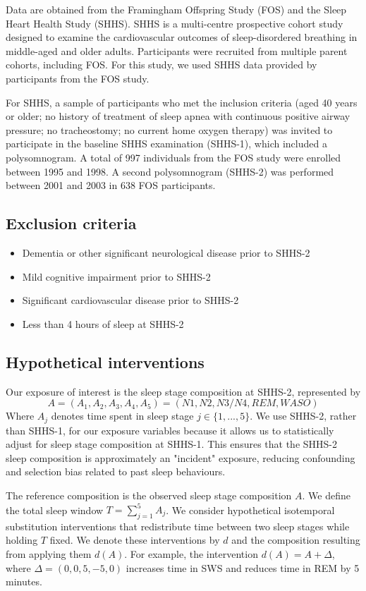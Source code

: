 \documentclass{article}
\begin{document}
Data are obtained from the Framingham Offspring Study (FOS) and the Sleep Heart Health Study (SHHS). SHHS is a multi-centre prospective cohort study designed to examine the cardiovascular outcomes of sleep-disordered breathing in middle-aged and older adults. Participants were recruited from multiple parent cohorts, including FOS. For this study, we used SHHS data provided by participants from the FOS study.

For SHHS, a sample of participants who met the inclusion criteria (aged 40 years or older; no history of treatment of sleep apnea with continuous positive airway pressure; no tracheostomy; no current home oxygen therapy) was invited to participate in the baseline SHHS examination (SHHS-1), which included a polysomnogram. A total of 997 individuals from the FOS study were enrolled between 1995 and 1998. A second polysomnogram (SHHS-2) was performed between 2001 and 2003 in 638 FOS participants.

\subsection{Exclusion criteria}

\begin{itemize}
    \item Dementia or other significant neurological disease prior to SHHS-2
    \item Mild cognitive impairment prior to SHHS-2
    \item Significant cardiovascular disease prior to SHHS-2
    \item Less than 4 hours of sleep at SHHS-2
\end{itemize}

\subsection{Hypothetical interventions}

Our exposure of interest is the sleep stage composition at SHHS-2, represented by $$A = (A_1, A_2, A_3, A_4, A_5) = (N1, N2, N3/N4, REM, WASO)$$ Where $A_j$ denotes time spent in sleep stage $j \in \{1,...,5\}$. We use SHHS-2, rather than SHHS-1, for our exposure variables because it allows us to statistically adjust for sleep stage composition at SHHS-1. This ensures that the SHHS-2 sleep composition is approximately an "incident" exposure, reducing confounding and selection bias related to past sleep behaviours.

The reference composition is the observed sleep stage composition $A$. We define the total sleep window $T = \sum_{j=1}^{5} A_j$. We consider hypothetical isotemporal substitution interventions that redistribute time between two sleep stages while holding $T$ fixed. We denote these interventions by $d$ and the composition resulting from applying them $d(A)$. For example, the intervention $d(A) = A + \Delta$, where $\Delta = (0, 0, 5, -5, 0)$ increases time in SWS and reduces time in REM by 5 minutes.
\end{document}
